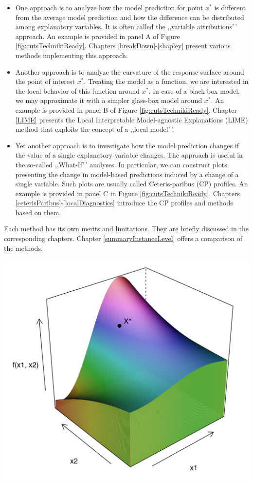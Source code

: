 \documentclass[12pt,]{krantz}
\providecommand{\tightlist}{%
  \setlength{\itemsep}{0pt}\setlength{\parskip}{0pt}}
\begin{document}
\begin{itemize}
\tightlist
\item
  One approach is to analyze how the model prediction for point \(x^*\) is different from the average model prediction and how the difference can be distributed among explanatory variables. It is often called the ,,variable attributions'\,' approach. An example is provided in panel A of Figure \ref{fig:cutsTechnikiReady}. Chapters \ref{breakDown}-\ref{shapley} present various methods implementing this approach.
\item
  Another approach is to analyze the curvature of the response surface around the point of interest \(x^*\). Treating the model as a function, we are interested in the local behavior of this function around \(x^*\). In case of a black-box model, we may approximate it with a simpler glass-box model around \(x^*\). An example is provided in panel B of Figure \ref{fig:cutsTechnikiReady}. Chapter \ref{LIME} presents the Local Interpretable Model-agnostic Explanations (LIME) method that exploits the concept of a ,,local model'\,'.
\item
  Yet another approach is to investigate how the model prediction changes if the value of a single explanatory variable changes. The approach is useful in the so-called ,,What-If'\,' analyses. In particular, we can construct plots presenting the change in model-based predictions induced by a change of a single variable. Such plots are usually called Ceteris-paribus (CP) profiles. An example is provided in panel C in Figure \ref{fig:cutsTechnikiReady}. Chapters \ref{ceterisParibus}-\ref{localDiagnostics} introduce the CP profiles and methods based on them.
\end{itemize}

Each method has its own merits and limitations. They are briefly discussed in the corresponding chapters. Chapter \ref{summaryInstanceLevel} offers a comparison of the methods.

\begin{center}\includegraphics[width=0.6\linewidth]{figure/cuts_surface_ready_punkt} \end{center}
\end{document}

